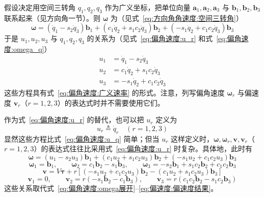 \begin{example}
    假设决定用空间三转角 $q_1,q_2,q_3$ 作为广义坐标，把单位向量 $\mathbf{a}_1,\mathbf{a}_2,\mathbf{a}_3$ 与 $\mathbf{b}_1,\mathbf{b}_2,\mathbf{b}_3$ 联系起来（见方向角一节）。则 $\bm{\omega}$ 为（见式~\eqref{eq:方向角角速度:空间三转角}）
    \begin{equation}
        \bm{\omega} = (\dot{q}_1-s_2\dot{q}_3)\mathbf{b}_1 + (c_1\dot{q}_2+s_1c_2\dot{q}_3)\mathbf{b}_2 + (-s_1\dot{q}_2+c_1c_2\dot{q}_3)\mathbf{b}_3
        \label{eq:偏角速度:omega_q}
    \end{equation}
    于是 $u_1,u_2,u_3$ 与 $q_1,q_2,q_3$ 的关系为（见式~\eqref{eq:偏角速度:u_r} 和式~\eqref{eq:偏角速度:omega_q}）
    \begin{equation}
        \begin{aligned}
            u_1 &= \dot{q}_1-s_2\dot{q}_3\\
            u_2 &= c_1\dot{q}_2+s_1c_2\dot{q}_3\\
            u_3 &= -s_1\dot{q}_2+c_1c_2\dot{q}_3
        \end{aligned}
        \label{eq:偏角速度:u_q}
    \end{equation}
    这些方程具有式~\eqref{eq:偏角速度:广义速率} 的形式。注意，列写偏角速度 $\bm{\omega}_r$ 与偏速度 $\mathbf{v}_r$（$r=1,2,3$）的表达式时并不需要使用它们。

    作为式~\eqref{eq:偏角速度:u_r} 的替代，也可以把 $u_r$ 定义为
    \begin{equation}
        u_r \triangleq \dot{q}_r \quad (r=1,2,3)
        \label{eq:偏角速度:u_r替代}
    \end{equation}
    显然这些方程比式~\eqref{eq:偏角速度:u_q} 简单；但当 $u_r$ 这样定义时，$\bm{\omega},\bm{\omega}_r,\mathbf{v},\mathbf{v}_r$（$r=1,2,3$）的表达式往往比采用式~\eqref{eq:偏角速度:u_r} 时复杂。具体地，此时有
    \begin{equation}
        \bm{\omega} = (u_1-s_2u_3)\mathbf{b}_1 + (c_1u_2+s_1c_2u_3)\mathbf{b}_2 + (-s_1u_2+c_1c_2u_3)\mathbf{b}_3
        \label{eq:偏角速度:omega替代}
    \end{equation}
    \begin{equation}
        \bm{\omega}_1 = \mathbf{b}_1,\qquad
        \bm{\omega}_2 = c_1\mathbf{b}_2-s_1\mathbf{b}_3,\qquad
        \bm{\omega}_3 = -s_2\mathbf{b}_1+s_1c_2\mathbf{b}_2+c_1c_2\mathbf{b}_3
        \label{eq:偏角速度:偏角速度替代}
    \end{equation}
    \begin{equation}
        \mathbf{v} = V\bm{\tau} + r[(-s_1u_2+c_1c_2u_3)\mathbf{b}_2-(c_1u_2+s_1c_2u_3)\mathbf{b}_3]
        \label{eq:偏速度:速度替代}
    \end{equation}
    \begin{equation}
        \mathbf{v}_1 = 0,\qquad
        \mathbf{v}_2 = r(-s_1\mathbf{b}_2-c_1\mathbf{b}_3),\qquad
        \mathbf{v}_3 = r(c_1c_2\mathbf{b}_2-s_1c_2\mathbf{b}_3)
        \label{eq:偏速度:偏速度替代}
    \end{equation}
    这些关系取代式~\eqref{eq:偏角速度:omega展开}--\eqref{eq:偏速度:偏速度结果}。
\end{example}

